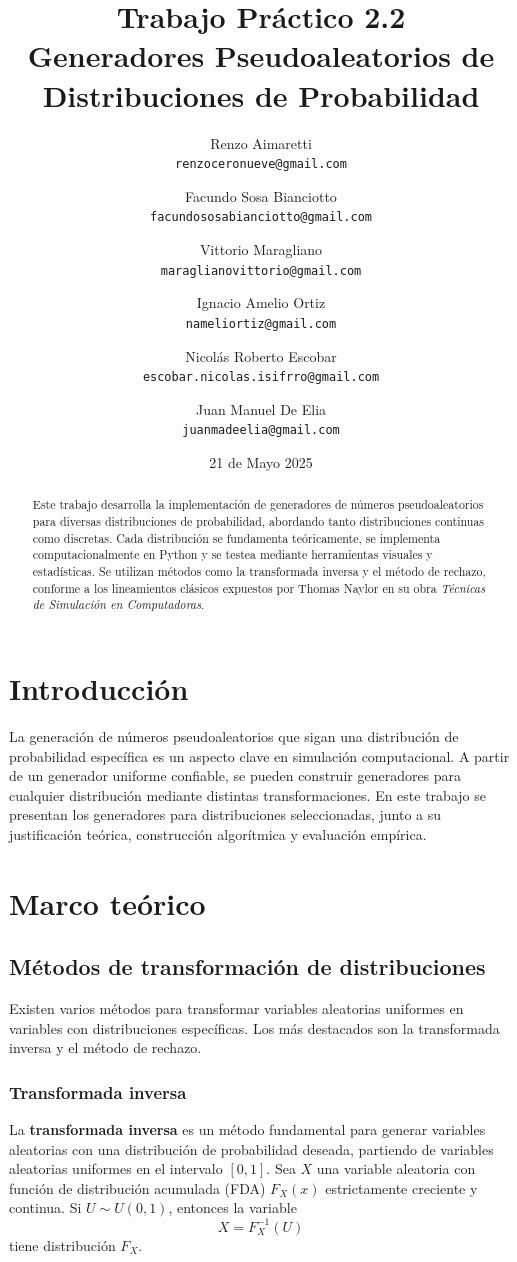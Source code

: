 \documentclass{article}
\title{Trabajo Práctico 2.2 \\
Generadores Pseudoaleatorios de Distribuciones de Probabilidad}
\author{
    Renzo Aimaretti \\ \texttt{renzoceronueve@gmail.com}
    \and
    Facundo Sosa Bianciotto \\ \texttt{facundososabianciotto@gmail.com}
    \and
    Vittorio Maragliano \\ \texttt{maraglianovittorio@gmail.com}
    \and
    Ignacio Amelio Ortiz \\ \texttt{nameliortiz@gmail.com}
    \and
    Nicolás Roberto Escobar \\ \texttt{escobar.nicolas.isifrro@gmail.com}
    \and
    Juan Manuel De Elia \\ \texttt{juanmadeelia@gmail.com}
}
\date{21 de Mayo 2025}
\begin{document}
\maketitle

\begin{abstract}
Este trabajo desarrolla la implementación de generadores de números pseudoaleatorios para diversas distribuciones de probabilidad, abordando tanto distribuciones continuas como discretas. Cada distribución se fundamenta teóricamente, se implementa computacionalmente en Python y se testea mediante herramientas visuales y estadísticas. Se utilizan métodos como la transformada inversa y el método de rechazo, conforme a los lineamientos clásicos expuestos por Thomas Naylor en su obra \textit{Técnicas de Simulación en Computadoras}.
\end{abstract}

\section{Introducción}
La generación de números pseudoaleatorios que sigan una distribución de probabilidad específica es un aspecto clave en simulación computacional. A partir de un generador uniforme confiable, se pueden construir generadores para cualquier distribución mediante distintas transformaciones. En este trabajo se presentan los generadores para distribuciones seleccionadas, junto a su justificación teórica, construcción algorítmica y evaluación empírica.

\section{Marco teórico}

\subsection{Métodos de transformación de distribuciones}

Existen varios métodos para transformar variables aleatorias uniformes en variables con distribuciones específicas. Los más destacados son la transformada inversa y el método de rechazo.

\subsubsection{Transformada inversa}

La \textbf{transformada inversa} es un método fundamental para generar variables aleatorias con una distribución de probabilidad deseada, partiendo de variables aleatorias uniformes en el intervalo $[0,1]$. Sea $X$ una variable aleatoria con función de distribución acumulada (FDA) $F_X(x)$ estrictamente creciente y continua. Si $U \sim U(0,1)$, entonces la variable
\begin{equation}
    X = F_X^{-1}(U)
\end{equation}
tiene distribución $F_X$.
\end{document}
